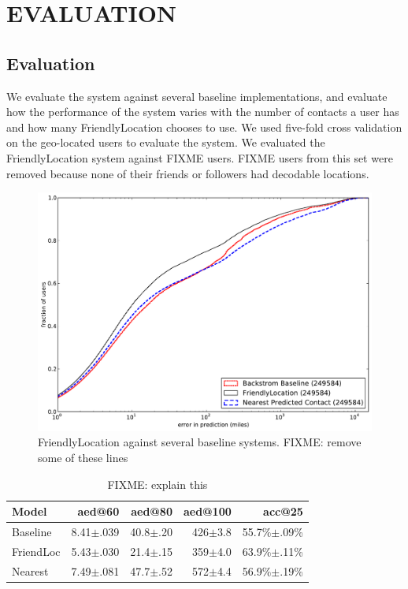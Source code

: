\ifdefined\THESIS
    \chapter{\uppercase{Evaluation}}
\else
    \section{Evaluation}
\fi

We evaluate the system against several baseline implementations, and evaluate
how the performance of the system varies with the number of contacts a user has
and how many FriendlyLocation chooses to use.
We used five-fold cross validation on the geo-located users to evaluate the system.
We evaluated the FriendlyLocation system against FIXME users.
FIXME users from this set were removed because none of their friends or
followers had decodable locations.


\begin{figure}[tb]
\centering
\includegraphics[width=\linewidth]{figures/fl_basic.pdf}
\caption{
    FriendlyLocation against several baseline systems.
    FIXME: remove some of these lines
}
\label{fig:NearProbFit}
\end{figure}

\begin{table}[tb]
\centering
\begin{tabular}{l  r r r r}
    Model
    & aed@60
    & aed@80
    & aed@100
    & acc@25 \\
    \hline
    Baseline & 8.41$\pm$.039 & 40.8$\pm$.20 & 426$\pm$3.8 & 55.7\%$\pm$.09\% \\
    FriendLoc & 5.43$\pm$.030 & 21.4$\pm$.15 & 359$\pm$4.0 & 63.9\%$\pm$.11\% \\
    Nearest & 7.49$\pm$.081 & 47.7$\pm$.52 & 572$\pm$4.4 & 56.9\%$\pm$.19\% \\
\end{tabular}
\caption{
FIXME: explain this
}
\label{tab:results}
\end{table}

